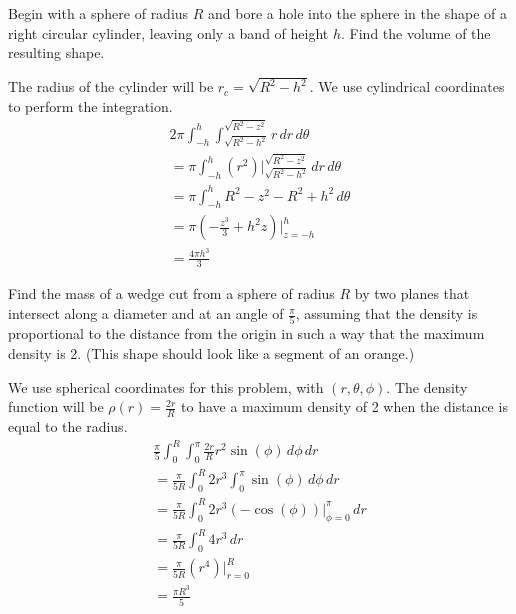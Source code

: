 \documentclass[12pt]{exam}
\begin{document}
\begin{questions}
\question Begin with a sphere of radius $R$ and bore a hole into the sphere in the shape of a right circular cylinder,
leaving only a band of height $h$. Find the volume of the resulting shape.
	\begin{solution}
		The radius of the cylinder will be $r_c = \sqrt{R^2 - h^2}$. We use cylindrical coordinates to perform the integration.
		\begin{gather*}
			2\pi \int_{-h}^{h} \int_{\sqrt{R^2 - h^2}}^{\sqrt{R^2 - z^2}} r \, dr\, d\theta \\
			= \pi \int_{-h}^{h} \left(r^2\right)|_{\sqrt{R^2 - h^2}}^{\sqrt{R^2 - z^2}}  \, dr\, d\theta \\
			= \pi \int_{-h}^{h} R^2 - z^2 - R^2 + h^2 \, d\theta \\
			= \pi \left(-\frac{z^3}{3} + h^2 z \right)|_{z = -h}^{h} \\
			= \boxed{\frac{4\pi h^3}{3}} \tag*{\qed}
		\end{gather*}
	\end{solution}
\question Find the mass of a wedge cut from a sphere of radius $R$ by two planes that intersect along a diameter and at an angle of $\frac{\pi}{5}$, assuming that the density is proportional to the distance from the origin in such a way that the maximum density is 2. (This shape should look like a segment of an orange.)
	\begin{solution}
		We use spherical coordinates for this problem, with $(r, \theta, \phi)$. The density function will be $\rho (r) = \frac{2 r}{R}$ to have a maximum density of 2 when the distance is equal to the radius.
		\begin{gather*}
			\frac{\pi}{5}\int_{0}^{R}\int_{0}^{\pi} \frac{2 r}{R} r^2 \sin(\phi)\, d\phi \, dr \\
			= \frac{\pi}{5R}\int_{0}^{R} 2 r^3 \int_{0}^{\pi} \sin(\phi)\, d\phi \, dr \\
			= \frac{\pi}{5R}\int_{0}^{R} 2 r^3 \left(-\cos(\phi)\right)|_{\phi = 0}^{\pi} \, dr \\
			= \frac{\pi}{5R}\int_{0}^{R} 4 r^3 \, dr \\
			= \frac{\pi}{5R} \left(r^4\right)|_{r=0}^{R} \\
			= \boxed{\frac{\pi R^3}{5}} \tag*{\qed}
		\end{gather*}
	\end{solution}


\end{questions}
\end{document}
